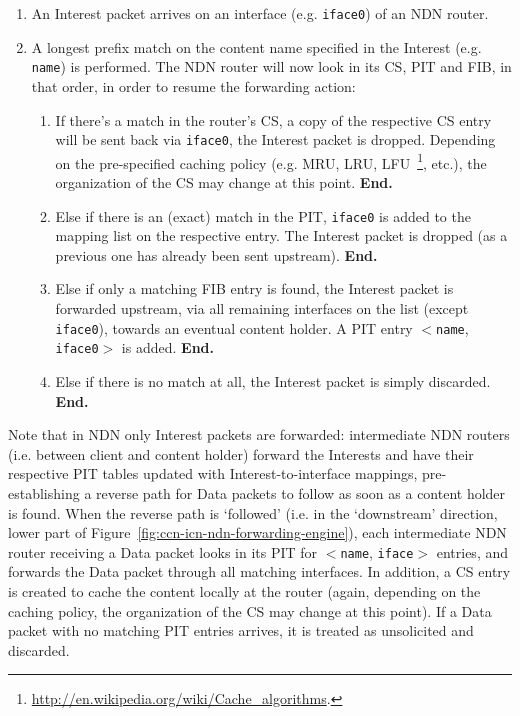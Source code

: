 \begin{enumerate}

    \item An Interest packet arrives on an interface (e.g. \verb+iface0+) of an NDN router.
    \item A longest prefix match on the content name specified in the Interest (e.g. \verb+name+) 
        is performed. The NDN router will now look in its CS, PIT and FIB, in 
        that order, in order to resume the forwarding action:
        \begin{enumerate}

            \item If there's a match in the router's CS, a copy of the respective 
                CS entry will be sent back via \verb+iface0+, the Interest 
                packet is dropped. Depending on the pre-specified 
                caching policy (e.g. MRU, LRU, LFU~\footnote{\url{http://en.wikipedia.org/wiki/Cache_algorithms}.}, 
                etc.), the organization of the CS 
                may change at this point. \textbf{End.}

            \item Else if there is an (exact) match in the PIT, \verb+iface0+ is 
                added to the mapping list on the respective entry. The 
                Interest packet is dropped (as a previous one has already been 
                sent upstream). \textbf{End.}

            \item Else if only a matching FIB entry is found, the Interest 
                packet is forwarded upstream, via all remaining interfaces on the 
                list (except \verb+iface0+), towards an eventual content holder. A PIT 
                entry $<$\verb+name+, \verb+iface0+$>$ is added. \textbf{End.}

            \item Else if there is no match at all, the Interest packet is 
                simply discarded. \textbf{End.}\shortvertbreak

        \end{enumerate}

\end{enumerate}

Note that in NDN only Interest packets are forwarded: intermediate NDN 
routers (i.e. between client and content holder) forward the 
Interests and have their respective PIT tables updated with Interest-to-interface 
mappings, pre-establishing a reverse path for Data packets to follow as soon as a 
content holder is found. When the reverse path is `followed' (i.e. in the 
`downstream' direction, lower part of Figure~\ref{fig:ccn-icn-ndn-forwarding-engine}), each 
intermediate NDN router receiving a 
Data packet looks in its PIT for $<$\verb+name+, \verb+iface+$>$ entries, 
and forwards the Data packet through all matching interfaces. In addition, a 
CS entry is created to cache the content locally at the router (again, depending 
on the caching policy, the organization of the CS may change at this point). If a Data packet 
with no matching PIT entries arrives, it is treated as unsolicited and discarded.

